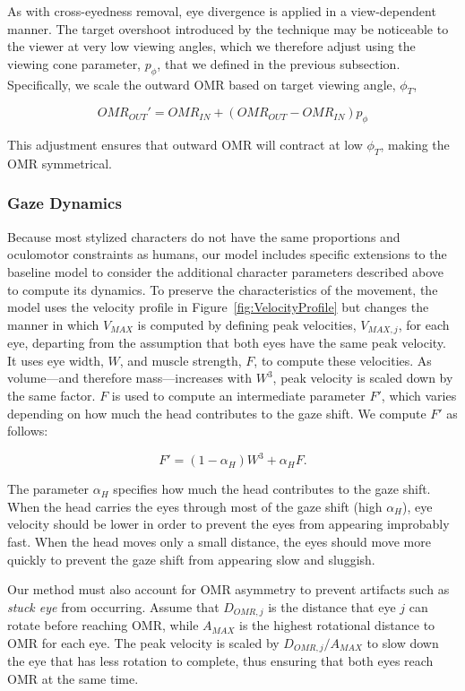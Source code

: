 As with cross-eyedness removal, eye divergence is applied in a view-dependent manner. The target overshoot introduced by the technique may be noticeable to the viewer at very low viewing angles, which we therefore adjust using the viewing cone parameter, $p_{\phi}$, that we defined in the previous subsection. Specifically, we scale the outward OMR based on target viewing angle, $\phi_T$,

\begin{equation}
OMR_{OUT}' = OMR_{IN} + ( OMR_{OUT} - OMR_{IN} ) p_{\phi}
\end{equation}

This adjustment ensures that outward OMR will contract at low $\phi_T$, making the OMR symmetrical.

\subsubsection{Gaze Dynamics}

Because most stylized characters do not have the same proportions and oculomotor constraints as humans, our model includes specific extensions to the baseline model to consider the additional character parameters described above to compute its dynamics. To preserve the characteristics of the movement, the model uses the velocity profile in Figure~\ref{fig:VelocityProfile} but changes the manner in which $V_{MAX}$ is computed by defining peak velocities, $V_{MAX,j}$, for each eye, departing from the assumption that both eyes have the same peak velocity. It uses eye width, $W$, and muscle strength, $F$, to compute these velocities. As volume---and therefore mass---increases with $W^3$, peak velocity is scaled down by the same factor. $F$ is used to compute an intermediate parameter $F'$, which varies depending on how much the head contributes to the gaze shift. We compute $F'$ as follows:

\begin{equation}
F' = ( 1 - \alpha_H ) W^3 + \alpha_H F.
\end{equation}

The parameter $\alpha_H$ specifies how much the head contributes to the gaze shift. When the head carries the eyes through most of the gaze shift (high $\alpha_H$), eye velocity should be lower in order to prevent the eyes from appearing improbably fast. When the head moves only a small distance, the eyes should move more quickly to prevent the gaze shift from appearing slow and sluggish.

Our method must also account for OMR asymmetry to prevent artifacts such as \textit{stuck eye} from occurring. Assume that $D_{OMR,j}$ is the distance that eye $j$ can rotate before reaching OMR, while $A_{MAX}$ is the highest rotational distance to OMR for each eye. The peak velocity is scaled by $D_{OMR,j}/A_{MAX}$ to slow down the eye that has less rotation to complete, thus ensuring that both eyes reach OMR at the same time.

